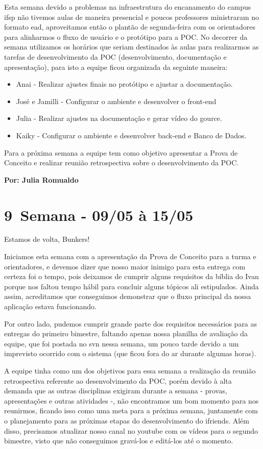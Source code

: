 Esta semana devido a problemas na infraestrutura do encanamento do campus \acs{ifsp} não tivemos aulas de maneira presencial e poucos professores ministraram no formato \acs{ead}, aproveitamos então o plantão de segunda-feira com os orientadores para alinharmos o fluxo de usuário e o protótipo para a \acs{POC}. No decorrer da semana utilizamos os horários que seriam destinados às aulas para realizarmos as tarefas de desenvolvimento da \acs{POC} (desenvolvimento, documentação e apresentação), para isto a equipe ficou organizada da seguinte maneira: 
\begin{itemize}
    \item Anai - Realizar ajustes finais no protótipo e ajustar a documentação.
    \item José e Jamilli - Configurar o ambiente e desenvolver o \gls{front-end}
    \item Julia - Realizar ajustes na documentação e gerar vídeo do \gls{gource}.
    \item Kaiky - Configurar o ambiente e desenvolver \gls{back-end} e Banco de Dados.
\end{itemize}
\noindent Para a próxima semana a equipe tem como objetivo apresentar a Prova de Conceito e realizar reunião retrospectiva sobre o desenvolvimento da \gls{POC}.

\textbf{Por: Julia Romualdo}

\section{9\textordfeminine \, Semana - 09/05 à 15/05}
Estamos de volta, Bunkers!

Iniciamos esta semana com a apresentação da Prova de Conceito para a turma e orientadores, e devemos dizer que nosso maior inimigo para esta entrega com certeza foi o tempo, pois deixamos de cumprir alguns requisitos da bíblia do Ivan porque nos faltou tempo hábil para concluir alguns tópicos ali estipulados. Ainda assim, acreditamos que conseguimos demonstrar que o fluxo principal da nossa aplicação estava funcionando. 

Por outro lado, pudemos cumprir grande parte dos requisitos necessários para as entregas do primeiro bimestre, faltando apenas nossa planilha de avaliação da equipe, que foi postada no \gls{svn} nessa semana, um pouco tarde devido a um imprevisto ocorrido com o sistema (que ficou fora do ar durante algumas horas). 

A equipe tinha como um dos objetivos para essa semana a realização da reunião retrospectiva referente ao desenvolvimento da \gls{POC}, porém devido à alta demanda que as outras disciplinas exigiram durante a semana - provas, apresentações e outras atividades -, não encontramos um bom momento para nos reunirmos, ficando isso como uma meta para a próxima semana, juntamente com o planejamento para as próximas etapas do desenvolvimento do \gls{ifriends}. Além disso, precisamos atualizar nosso canal no \gls{youtube} com os vídeos para o segundo bimestre, visto que não conseguimos gravá-los e editá-los até o momento. 

